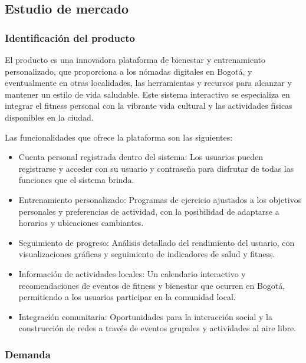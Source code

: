 \subsection{Estudio de mercado}


{\color{red}
\subsubsection*{Identificación del producto}

El producto es una innovadora plataforma de bienestar y entrenamiento personalizado, que proporciona a los nómadas digitales en Bogotá, y eventualmente en otras localidades, las herramientas y recursos para alcanzar y mantener un estilo de vida saludable. Este sistema interactivo se especializa en integrar el fitness personal con la vibrante vida cultural y las actividades físicas disponibles en la ciudad.

Las funcionalidades que ofrece la plataforma son las siguientes:

\begin{itemize}
    \item Cuenta personal registrada dentro del sistema: Los usuarios pueden registrarse y acceder con su usuario y contraseña para disfrutar de todas las funciones que el sistema brinda.
    
    \item Entrenamiento personalizado: Programas de ejercicio ajustados a los objetivos personales y preferencias de actividad, con la posibilidad de adaptarse a horarios y ubicaciones cambiantes.
    
    \item Seguimiento de progreso: Análisis detallado del rendimiento del usuario, con visualizaciones gráficas y seguimiento de indicadores de salud y fitness.
    
    \item Información de actividades locales: Un calendario interactivo y recomendaciones de eventos de fitness y bienestar que ocurren en Bogotá, permitiendo a los usuarios participar en la comunidad local.
    
    \item Integración comunitaria: Oportunidades para la interacción social y la construcción de redes a través de eventos grupales y actividades al aire libre.
    
\end{itemize}

\subsubsection*{Demanda}

}
